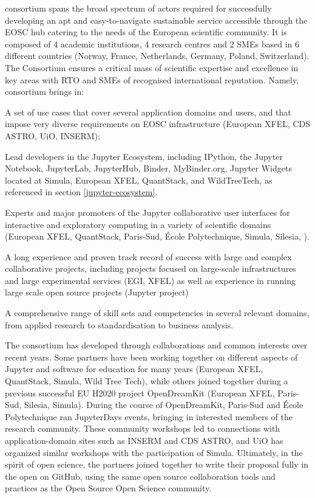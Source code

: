 \TheProject consortium spans the broad spectrum of actors required
for successfully developing an apt and easy-to-navigate sustainable service
accessible through the EOSC hub catering to the needs of the European
scientific community. It is composed of 4 academic institutions, 4 research
centres and 2 SMEs based in 6 different countries (Norway, France,
Netherlands, Germany, Poland, Switzerland).
The Consortium ensures a critical mass of scientific expertise and excellence
in key areas  with RTO and SMEs of recognised
 international reputation. Namely, \TheProject consortium brings in:
\begin{compactitem}
\item A set of use cases that cover several application domains and users, and that impose very diverse
requirements on EOSC infrastructure (European XFEL, CDS ASTRO, UiO, INSERM);
\item Lead developers in the Jupyter Ecosystem, including IPython, the Jupyter Notebook, JupyterLab,
JupyterHub, Binder, MyBinder.org, Jupyter Widgets located at Simula, European XFEL, QuantStack, and
WildTreeTech,
as referenced in section \ref{jupyter-ecosystem}.
\item Experts and major promoters of the Jupyter collaborative user interfaces for interactive and exploratory
computing in a variety of scientific domains (European XFEL, QuantStack, Paris-Sud, \'Ecole Polytechnique,
Simula, Silesia, ).
\item A long experience and proven track record of success with large and complex collaborative projects,
including projects focused on large-scale infrastructures and large experimental services (EGI, XFEL) as well
as experience in running large scale open source projects (Jupyter project)
\item A comprehensive range of skill sets and competencies in several relevant domains, from applied
research to standardisation to business
analysis.
\end{compactitem}

The consortium has developed through collaborations and common interests over recent years.
Some partners have been working together on different aspects of Jupyter
and software for education for many years (European XFEL, QuantStack, Simula, Wild Tree Tech),
while others joined together during a previous successful EU H2020 project OpenDreamKit (European XFEL,
Paris-Sud, Silesia, Simula).
During the course of OpenDreamKit, Paris-Sud and \'Ecole Polytechnique
ran JupyterDays events, bringing in interested members of the research community.
These community workshops led to connections with application-domain sites such as INSERM and CDS
ASTRO,
and UiO has organized similar workshops with the participation of Simula.
Ultimately, in the spirit of open science,
the partners joined together to write their proposal fully in the open on GitHub,
using the same open source collaboration tools and practices
as the Open Source Open Science community.

